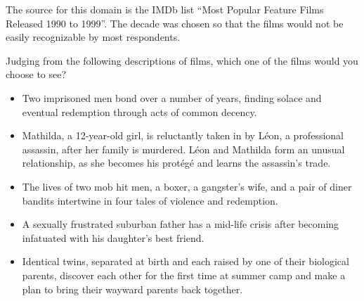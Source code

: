 
The source for this domain is the IMDb list ``Most Popular Feature Films Released 1990 to
1999''.
The decade was chosen so that the films would not be easily recognizable by most respondents.

\begin{tcolorbox}
Judging from the following descriptions of films, which one of the films would you choose to see?

\begin{itemize}
	\setlength\itemsep{-15pt}
	\item Two imprisoned men bond over a number of years, finding solace and
eventual redemption through acts of common decency. \\
	\item Mathilda, a 12-year-old girl, is reluctantly taken in by L\'eon, a
professional assassin, after her family is murdered. L\'eon and Mathilda
form an unusual relationship, as she becomes his prot\'eg\'e and learns the
assassin's trade. \\
	\item The lives of two mob hit men, a boxer, a gangster's wife, and a pair
of diner bandits intertwine in four tales of violence and redemption. \\
	\item A sexually frustrated suburban father has a mid-life crisis after
becoming infatuated with his daughter's best friend. \\
	\item Identical twins, separated at birth and each raised by one of their
biological parents, discover each other for the first time at summer camp
and make a plan to bring their wayward parents back together.
\end{itemize}
\end{tcolorbox}
